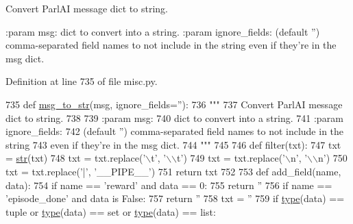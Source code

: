 \begin{DoxyVerb}Convert ParlAI message dict to string.

:param msg:
    dict to convert into a string.
:param ignore_fields:
    (default '') comma-separated field names to not include in the string
    even if they're in the msg dict.
\end{DoxyVerb}
 

Definition at line 735 of file misc.\+py.


\begin{DoxyCode}
735 \textcolor{keyword}{def }\hyperlink{namespaceparlai_1_1utils_1_1misc_ae5db473b41d3b49814e2566e866282b6}{msg\_to\_str}(msg, ignore\_fields=''):
736     \textcolor{stringliteral}{"""}
737 \textcolor{stringliteral}{    Convert ParlAI message dict to string.}
738 \textcolor{stringliteral}{}
739 \textcolor{stringliteral}{    :param msg:}
740 \textcolor{stringliteral}{        dict to convert into a string.}
741 \textcolor{stringliteral}{    :param ignore\_fields:}
742 \textcolor{stringliteral}{        (default '') comma-separated field names to not include in the string}
743 \textcolor{stringliteral}{        even if they're in the msg dict.}
744 \textcolor{stringliteral}{    """}
745 
746     \textcolor{keyword}{def }filter(txt):
747         txt = \hyperlink{namespacegenerate__task__READMEs_a5b88452ffb87b78c8c85ececebafc09f}{str}(txt)
748         txt = txt.replace(\textcolor{stringliteral}{'\(\backslash\)t'}, \textcolor{stringliteral}{'\(\backslash\)\(\backslash\)t'})
749         txt = txt.replace(\textcolor{stringliteral}{'\(\backslash\)n'}, \textcolor{stringliteral}{'\(\backslash\)\(\backslash\)n'})
750         txt = txt.replace(\textcolor{stringliteral}{'|'}, \textcolor{stringliteral}{'\_\_PIPE\_\_'})
751         \textcolor{keywordflow}{return} txt
752 
753     \textcolor{keyword}{def }add\_field(name, data):
754         \textcolor{keywordflow}{if} name == \textcolor{stringliteral}{'reward'} \textcolor{keywordflow}{and} data == 0:
755             \textcolor{keywordflow}{return} \textcolor{stringliteral}{''}
756         \textcolor{keywordflow}{if} name == \textcolor{stringliteral}{'episode\_done'} \textcolor{keywordflow}{and} data \textcolor{keywordflow}{is} \textcolor{keyword}{False}:
757             \textcolor{keywordflow}{return} \textcolor{stringliteral}{''}
758         txt = \textcolor{stringliteral}{''}
759         \textcolor{keywordflow}{if} \hyperlink{namespaceparlai_1_1agents_1_1tfidf__retriever_1_1build__tfidf_ad5dfae268e23f506da084a9efb72f619}{type}(data) == tuple \textcolor{keywordflow}{or} \hyperlink{namespaceparlai_1_1agents_1_1tfidf__retriever_1_1build__tfidf_ad5dfae268e23f506da084a9efb72f619}{type}(data) == set \textcolor{keywordflow}{or} \hyperlink{namespaceparlai_1_1agents_1_1tfidf__retriever_1_1build__tfidf_ad5dfae268e23f506da084a9efb72f619}{type}(data) == list:

\end{DoxyCode}
